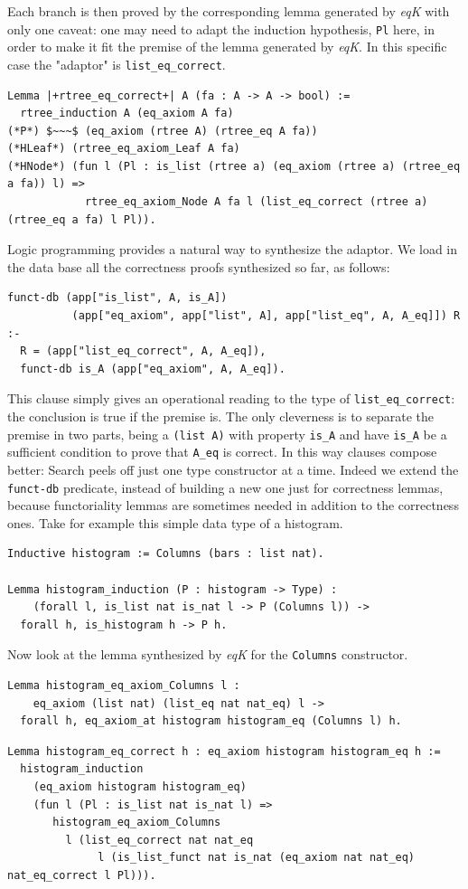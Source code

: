 \documentclass[a4paper,UKenglish,cleveref, autoref]{lipics-v2019}
\newcommand{\derive}[1]{\emph{#1}}
\begin{document}
\noindent
Each branch is then proved by the corresponding
lemma generated by \derive{eqK} with only one caveat:
one may need to adapt the induction hypothesis, 
\lstinline+Pl+ here, in order to make it fit the premise
of the lemma generated by \derive{eqK}. In this specific
case the "adaptor" is \lstinline+list_eq_correct+.
\begin{lstlisting}
Lemma |+rtree_eq_correct+| A (fa : A -> A -> bool) :=
  rtree_induction A (eq_axiom A fa)
(*P*) $~~~$ (eq_axiom (rtree A) (rtree_eq A fa))
(*HLeaf*) (rtree_eq_axiom_Leaf A fa)
(*HNode*) (fun l (Pl : is_list (rtree a) (eq_axiom (rtree a) (rtree_eq a fa)) l) =>
            rtree_eq_axiom_Node A fa l (list_eq_correct (rtree a) (rtree_eq a fa) l Pl)).
\end{lstlisting}

Logic programming provides a natural way to synthesize
the adaptor.  We load in the data base
all the correctness proofs synthesized so far, as follows:
\begin{lstlisting}[]
funct-db (app["is_list", A, is_A])
          (app["eq_axiom", app["list", A], app["list_eq", A, A_eq]]) R :-
  R = (app["list_eq_correct", A, A_eq]),
  funct-db is_A (app["eq_axiom", A, A_eq]).
\end{lstlisting}

\noindent
This clause simply gives an operational reading to the type
of \lstinline+list_eq_correct+: the conclusion is true if the premise
is. The only cleverness is to separate the premise in two parts,
being a \lstinline+(list A)+ with property \lstinline+is_A+ and have
\lstinline+is_A+ be a sufficient condition to prove that \lstinline+A_eq+
is correct. In this way clauses compose better:
Search peels off just one type constructor at a time.
Indeed we extend the \lstinline+funct-db+ predicate, instead of building
a new one just for correctness lemmas, because functoriality lemmas
are sometimes needed in addition to the correctness ones.
Take for example this simple data type of a histogram.
\begin{lstlisting}
Inductive histogram := Columns (bars : list nat).

Lemma histogram_induction (P : histogram -> Type) :
    (forall l, is_list nat is_nat l -> P (Columns l)) ->
  forall h, is_histogram h -> P h.
\end{lstlisting}

Now look at the lemma synthesized by \derive{eqK}
for the \lstinline+Columns+ constructor.
\begin{lstlisting}
Lemma histogram_eq_axiom_Columns l :
    eq_axiom (list nat) (list_eq nat nat_eq) l ->
  forall h, eq_axiom_at histogram histogram_eq (Columns l) h.
\end{lstlisting}
\begin{lstlisting}
Lemma histogram_eq_correct h : eq_axiom histogram histogram_eq h :=
  histogram_induction 
    (eq_axiom histogram histogram_eq)
    (fun l (Pl : is_list nat is_nat l) =>
       histogram_eq_axiom_Columns
         l (list_eq_correct nat nat_eq
              l (is_list_funct nat is_nat (eq_axiom nat nat_eq) nat_eq_correct l Pl))).
\end{lstlisting}
\end{document}

